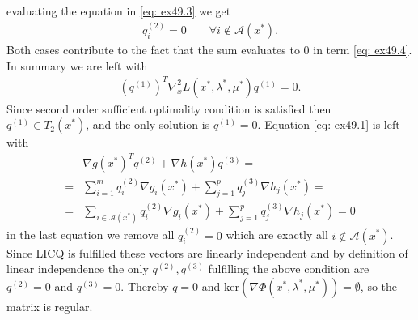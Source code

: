 evaluating the equation in \ref{eq: ex49.3} we get
\begin{align}
    q_i^{(2)} = 0 \qquad \forall i \not\in \mathcal{A}(x^{*}).
\end{align}
Both cases contribute to the fact that the sum evaluates to 0 in term
\ref{eq: ex49.4}. In summary we are left with
\begin{align}
    (q^{(1)})^{T}\nabla_x^{2}L(x^{*},\lambda^{*},\mu^{*})q^{(1)} =0.
\end{align}
Since second order sufficient optimality condition is satisfied then $q^{(1)}
\in T_2(x^{*})$, and the only solution is $q^{(1)} = 0$. Equation \ref{eq:
ex49.1} is left with
\begin{align}
    &\nabla g(x^{*})^{T}q^{(2)}+\nabla h(x^{*})q^{(3)} =\\
    =& \sum_{i=1}^{m} q_i^{(2)}\nabla g_i(x^{*})
    + \sum_{j=1}^{p} q_j^{(3)}  \nabla h_j(x^{*}) =\\
=& \sum_{i \in \mathcal{A}(x^{*})} q_i^{(2)}\nabla g_i(x^{*})
    + \sum_{j=1}^{p} q_j^{(3)}  \nabla h_j(x^{*}) = 0
\end{align}
in the last equation we remove all $q^{(2)}_i = 0$ which are exactly all $i
\not\in \mathcal{A}(x^{*})$. Since LICQ is fulfilled these vectors are
linearly independent and by definition of linear independence the only
$q^{(2)}, q^{(3)}$ fulfilling the above condition are $q^{(2)} = 0$ and
$q^{(3)} = 0$. Thereby $q = 0$ and
$\text{ker}(\nabla\Phi(x^{*},\lambda^{*},\mu^{*})) = \emptyset$, so the
matrix is regular.




























